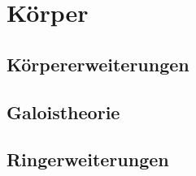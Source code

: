 \section{Körper}
\subsection{Körpererweiterungen}

\subsection{Galoistheorie}

\subsection{Ringerweiterungen}
